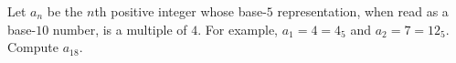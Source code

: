 Let $a_n$ be the $n$th positive integer whose base-$5$ representation, when read as a base-$10$ number, is a multiple of $4$. For example, $a_1=4=4_5$ and $a_2=7=12_5$. Compute $a_{18}$.
